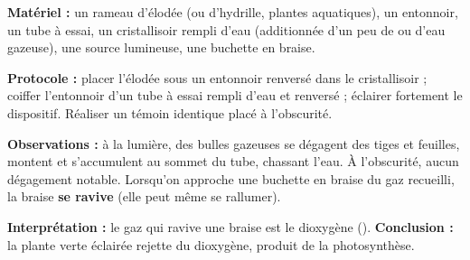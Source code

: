 \documentclass[11pt]{article}
\newcommand{\cle}[1]{{\popxbold\color{popdark}#1}}
\begin{document}
\begin{experience}
\textbf{Matériel :} un rameau d'\cle{élodée} (ou d'hydrille, plantes aquatiques), un entonnoir, un tube à essai, un cristallisoir rempli d'eau (additionnée d'un peu de  ou d'eau gazeuse), une source lumineuse, une buchette en braise.

\textbf{Protocole :} placer l'élodée sous un entonnoir renversé dans le cristallisoir ; coiffer l'entonnoir d'un tube à essai rempli d'eau et renversé ; éclairer fortement le dispositif. Réaliser un témoin identique placé à l'obscurité.

\textbf{Observations :} à la lumière, des bulles gazeuses se dégagent des tiges et feuilles, montent et s'accumulent au sommet du tube, chassant l'eau. À l'obscurité, aucun dégagement notable. Lorsqu'on approche une buchette en braise du gaz recueilli, la braise \textbf{se ravive} (elle peut même se rallumer).

\textbf{Interprétation :} le gaz qui ravive une braise est le \cle{dioxygène} (). \textbf{Conclusion :} la plante verte éclairée rejette du dioxygène, produit de la photosynthèse.
\end{experience}
\end{document}
